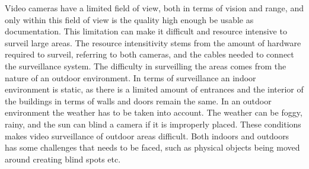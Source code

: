 Video cameras have a limited field of view, both in terms of vision and range, and only within this field of view is the quality high enough be usable as documentation.
This limitation can make it difficult and resource intensive to surveil large areas.
The resource intensitivity stems from the amount of hardware required to surveil, referring to both cameras, and the cables needed to connect the surveillance system.
The difficulty in surveilling the areas comes from the nature of an outdoor environment.
In terms of surveillance an indoor environment is static, as there is a limited amount of entrances and the interior of the buildings in terms of walls and doors remain the same.
In an outdoor environment the weather has to be taken into account.
The weather can be foggy, rainy, and the sun can blind a camera if it is improperly placed.
These conditions makes video surveillance of outdoor areas difficult.
Both indoors and outdoors has some challenges that needs to be faced, such as physical objects being moved around creating blind spots etc.

